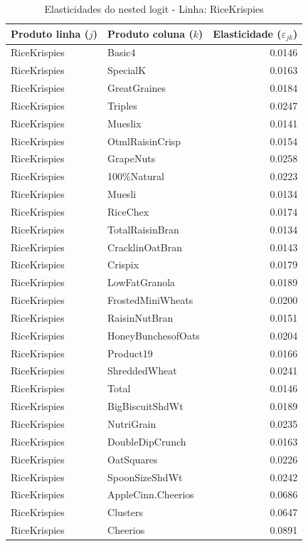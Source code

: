 \begingroup
\begin{table}[H]
\centering
\caption{Elasticidades do nested logit - Linha: RiceKrispies}
\label{tab:elas-nested-ricekrispies}
\small
\begin{tabular}{llr}
\toprule
Produto linha ($j$) & Produto coluna ($k$) & Elasticidade ($\varepsilon_{jk}$) \\
\midrule
RiceKrispies & Basic4 & 0.0146 \\
RiceKrispies & SpecialK & 0.0163 \\
RiceKrispies & GreatGraines & 0.0184 \\
RiceKrispies & Triples & 0.0247 \\
RiceKrispies & Mueslix & 0.0141 \\
RiceKrispies & OtmlRaisinCrisp & 0.0154 \\
RiceKrispies & GrapeNuts & 0.0258 \\
RiceKrispies & 100\%Natural & 0.0223 \\
RiceKrispies & Muesli & 0.0134 \\
RiceKrispies & RiceChex & 0.0174 \\
RiceKrispies & TotalRaisinBran & 0.0134 \\
RiceKrispies & CracklinOatBran & 0.0143 \\
RiceKrispies & Crispix & 0.0179 \\
RiceKrispies & LowFatGranola & 0.0189 \\
RiceKrispies & FrostedMiniWheats & 0.0200 \\
RiceKrispies & RaisinNutBran & 0.0151 \\
RiceKrispies & HoneyBunchesofOats & 0.0204 \\
RiceKrispies & Product19 & 0.0166 \\
RiceKrispies & ShreddedWheat & 0.0241 \\
RiceKrispies & Total & 0.0146 \\
RiceKrispies & BigBiscuitShdWt & 0.0189 \\
RiceKrispies & NutriGrain & 0.0235 \\
RiceKrispies & DoubleDipCrunch & 0.0163 \\
RiceKrispies & OatSquares & 0.0226 \\
RiceKrispies & SpoonSizeShdWt & 0.0242 \\
RiceKrispies & AppleCinn.Cheerios & 0.0686 \\
RiceKrispies & Clusters & 0.0647 \\
RiceKrispies & Cheerios & 0.0891 \\

\end{tabular}
\end{table}
